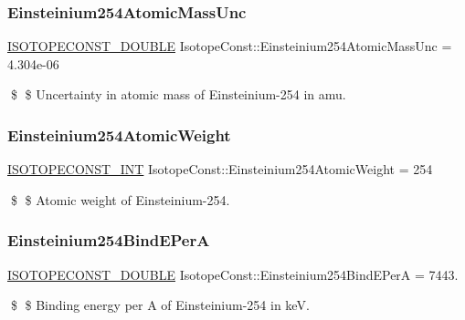 \subsubsection{\texorpdfstring{Einsteinium254\+Atomic\+Mass\+Unc}{Einsteinium254AtomicMassUnc}}
{\footnotesize\ttfamily \mbox{\hyperlink{group___isotope_const-_macros_ga8f45a7272ce02c0b4c65c44636ed719a}{I\+S\+O\+T\+O\+P\+E\+C\+O\+N\+S\+T\+\_\+\+D\+O\+U\+B\+LE}} Isotope\+Const\+::\+Einsteinium254\+Atomic\+Mass\+Unc = 4.\+304e-\/06}

\$ \$ Uncertainty in atomic mass of Einsteinium-\/254 in amu. \mbox{\label{group___isotope_const-_einsteinium-_es254_ga84379fa63b698044cb8f8c5fe30c779b}} 
\subsubsection{\texorpdfstring{Einsteinium254\+Atomic\+Weight}{Einsteinium254AtomicWeight}}
{\footnotesize\ttfamily \mbox{\hyperlink{group___isotope_const-_macros_ga5f18360b3e99483a35c32d789e62621c}{I\+S\+O\+T\+O\+P\+E\+C\+O\+N\+S\+T\+\_\+\+I\+NT}} Isotope\+Const\+::\+Einsteinium254\+Atomic\+Weight = 254}

\$ \$ Atomic weight of Einsteinium-\/254. \mbox{\label{group___isotope_const-_einsteinium-_es254_ga626cd4075548f63c45bf9cb43c76d09b}} 
\subsubsection{\texorpdfstring{Einsteinium254\+Bind\+E\+PerA}{Einsteinium254BindEPerA}}
{\footnotesize\ttfamily \mbox{\hyperlink{group___isotope_const-_macros_ga8f45a7272ce02c0b4c65c44636ed719a}{I\+S\+O\+T\+O\+P\+E\+C\+O\+N\+S\+T\+\_\+\+D\+O\+U\+B\+LE}} Isotope\+Const\+::\+Einsteinium254\+Bind\+E\+PerA = 7443.}

\$ \$ Binding energy per A of Einsteinium-\/254 in keV. \mbox{\label{group___isotope_const-_einsteinium-_es254_ga8d0597af7977c97a56296c7f94201925}} 
